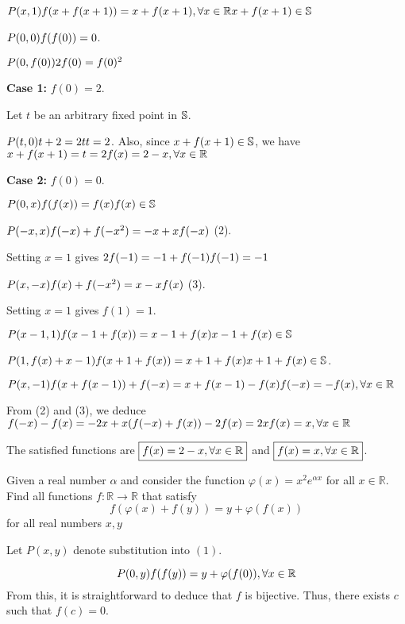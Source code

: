 \documentclass[11pt]{scrartcl}
\begin{document}
\begin{itemize}[label=, leftmargin=0em, itemsep=0.2em]
\begin{sol}
        $P(x,1) \ra f(x + f(x + 1)) = x + f(x + 1), \xr \ra x + f(x + 1) \in \bb{S}$

        $P(0,0) \ra f(f(0)) = 0$.

        $P(0,f(0)) \ra 2f(0) = f(0)^2$

        \textbf{Case 1:} $f(0) = 2$.

        Let $t$ be an arbitrary fixed point in $\mathbb{S}$.

        $P(t,0) \ra t + 2 = 2t \ra t = 2$. Also, since $x + f(x + 1) \in \mathbb{S}$, we have $x + f(x + 1) = t = 2 \ra f(x) = 2 - x, \xr$

        \textbf{Case 2:} $f(0) = 0$.

        $P(0,x) \ra f(f(x)) = f(x) \ra f(x) \in \bb{S}$

        $P(-x,x) \ra f(-x) + f(-x^2) = -x + x f(-x)$ (2).

        Setting $x = 1$ gives $2f(-1) = -1 + f(-1) \ra f(-1) = -1$

        $P(x,-x) \ra f(x) + f(-x^2) = x - x f(x)$ (3).

        Setting $x = 1$ gives $f(1) = 1$.

        $P(x - 1, 1) \ra f(x - 1 + f(x)) = x - 1 + f(x) \ra x - 1 + f(x) \in \bb{S}$

        $P(1, f(x) + x - 1) \ra f(x + 1 + f(x)) = x + 1 + f(x) \ra x + 1 + f(x) \in \bb{S}$.

        $P(x,-1) \ra f(x + f(x - 1)) + f(-x) = x + f(x - 1) - f(x) \ra f(-x) = -f(x), \xr$

        From (2) and (3), we deduce $f(-x) - f(x) = -2x + x(f(-x) + f(x)) \ra -2f(x) = 2x \ra f(x) = x, \xr$

        The satisfied functions are $\boxed{f(x) = 2-x, \forall x\in \mathbb{R}}$ and $\boxed{f(x) = x, \forall x\in \mathbb{R}}$.

    \end{sol}
    \begin{bt}
        Given a real number \(\alpha\) and consider the function \(\varphi(x) = x^2 e^{\alpha x}\) for all \(x \in \mathbb{R}\).
        Find all functions $f: \mathbb{R} \to \mathbb{R}$ that satisfy
            $$
            f(\varphi(x)+f(y))=y+\varphi(f(x))
            $$
            for all real numbers $x, y$
    \end{bt}
   
    \begin{sol}
        Let \( P(x,y) \) denote substitution into \( (1) \).

        \[ P(0,y) \ra f(f(y)) = y + \varphi(f(0)), \xr \]
        From this, it is straightforward to deduce that \( f \) is bijective. Thus, there exists \( c \) such that \( f(c) = 0 \).


\end{sol}
\end{itemize}
\end{document}
